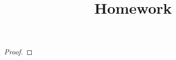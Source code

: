 \documentclass[11pt]{article}
\title{
	\vspace{0pt}
	\normalsize \hfill \name \sid
	\\\vspace{10pt}
	\Large \coursename Homework \hw
}
\theoremstyle{quest}
\newcommand{\problem}[1]{\section{#1}}        %
\newcommand{\subproblem}[1]{\subsection{#1}}      %
\begin{document}
  \maketitle
  \problem{}
    \subproblem{}
      \begin{proof}
      \end{proof}
\end{document}
